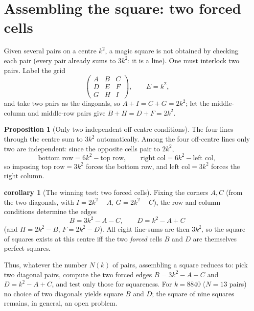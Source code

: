 \documentclass[11pt]{article}
\theoremstyle{definition}
\newtheorem{proposition}{Proposition}
\newtheorem{corollary}{corollary}
\begin{document}
\section{Assembling the square: two forced cells}

Given several pairs on a centre $k^{2}$, a magic square is not obtained by
checking each pair (every pair already sums to $3k^{2}$: it is a line). One must
interlock two pairs. Label the grid
\[
  \begin{pmatrix} A & B & C\\ D & E & F\\ G & H & I\end{pmatrix},
  \qquad E=k^{2},
\]
and take two pairs as the diagonals, so $A+I=C+G=2k^{2}$; let the middle-column
and middle-row pairs give $B+H=D+F=2k^{2}$.

\begin{proposition}[Only two independent off-centre conditions]\label{prop:twocond}
The four lines through the centre sum to $3k^{2}$ automatically. Among the four
off-centre lines only two are independent: since the opposite cells pair to
$2k^{2}$,
\[
  \text{bottom row}=6k^{2}-\text{top row},\qquad
  \text{right col}=6k^{2}-\text{left col},
\]
so imposing $\text{top row}=3k^{2}$ forces the bottom row, and
$\text{left col}=3k^{2}$ forces the right column.
\end{proposition}

\begin{corollary}[The winning test: two forced cells]\label{cor:forced}
Fixing the corners $A,C$ (from the two diagonals, with $I=2k^{2}-A$,
$G=2k^{2}-C$), the row and column conditions determine the edges
\[
  B = 3k^{2}-A-C,\qquad D = k^{2}-A+C
\]
(and $H=2k^{2}-B$, $F=2k^{2}-D$). All eight line-sums are then $3k^{2}$, so the
square of squares exists at this centre iff the two \emph{forced} cells $B$ and
$D$ are themselves perfect squares.
\end{corollary}

\noindent Thus, whatever the number $N(k)$ of pairs, assembling a square reduces
to: pick two diagonal pairs, compute the two forced edges $B=3k^{2}-A-C$ and
$D=k^{2}-A+C$, and test only those for squareness. For $k=8840$ ($N=13$ pairs) no
choice of two diagonals yields square $B$ and $D$; the square of nine squares
remains, in general, an open problem.
\end{document}
